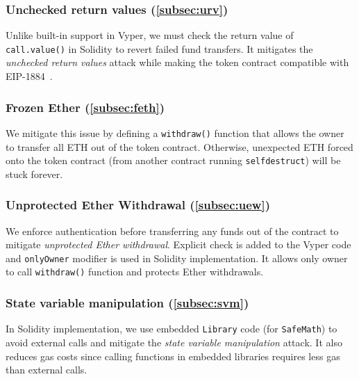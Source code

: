 \subsubsection{Unchecked return values (\ref{subsec:urv})}
Unlike built-in support in Vyper, we must check the return value of \texttt{call.value()} in Solidity to revert failed fund transfers. It mitigates the \textit{unchecked return values} attack while making the token contract compatible with EIP-1884~\cite{EIP1884}. 

\subsubsection{Frozen Ether (\ref{subsec:feth})}
We mitigate this issue by defining a \texttt{withdraw()} function that allows the owner to transfer all ETH out of the token contract. Otherwise, unexpected ETH forced onto the token contract (\eg from another contract running \texttt{selfdestruct}) will be stuck forever. 

\subsubsection{Unprotected Ether Withdrawal (\ref{subsec:uew})}
We enforce authentication before transferring any funds out of the contract to mitigate \textit{unprotected Ether withdrawal}. Explicit check is added to the Vyper code and \texttt{onlyOwner} modifier is used in Solidity implementation. It allows only owner to call \texttt{withdraw()} function and protects Ether withdrawals. 

\subsubsection{State variable manipulation (\ref{subsec:svm})}
In Solidity implementation, we use embedded \texttt{Library} code (for \texttt{SafeMath}) to avoid external calls and mitigate the \textit{state variable manipulation} attack. It also reduces gas costs since calling functions in embedded libraries requires less gas than external calls.
	


